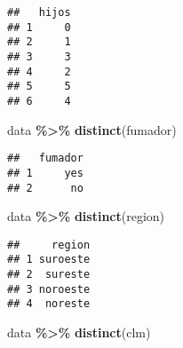 \documentclass[
]{article}
\newenvironment{Shaded}{\begin{snugshade}}{\end{snugshade}}
\newcommand{\FunctionTok}[1]{\textcolor[rgb]{0.13,0.29,0.53}{\textbf{#1}}}
\newcommand{\NormalTok}[1]{#1}
\newcommand{\SpecialCharTok}[1]{\textcolor[rgb]{0.81,0.36,0.00}{\textbf{#1}}}
\begin{document}
\begin{verbatim}
##   hijos
## 1     0
## 2     1
## 3     3
## 4     2
## 5     5
## 6     4
\end{verbatim}

\begin{Shaded}
\begin{Highlighting}[]
\NormalTok{data }\SpecialCharTok{\%\textgreater{}\%} \FunctionTok{distinct}\NormalTok{(fumador)}
\end{Highlighting}
\end{Shaded}

\begin{verbatim}
##   fumador
## 1     yes
## 2      no
\end{verbatim}

\begin{Shaded}
\begin{Highlighting}[]
\NormalTok{data }\SpecialCharTok{\%\textgreater{}\%} \FunctionTok{distinct}\NormalTok{(region)}
\end{Highlighting}
\end{Shaded}

\begin{verbatim}
##     region
## 1 suroeste
## 2  sureste
## 3 noroeste
## 4  noreste
\end{verbatim}

\begin{Shaded}
\begin{Highlighting}[]
\NormalTok{data }\SpecialCharTok{\%\textgreater{}\%} \FunctionTok{distinct}\NormalTok{(clm)}
\end{Highlighting}
\end{Shaded}
\end{document}
